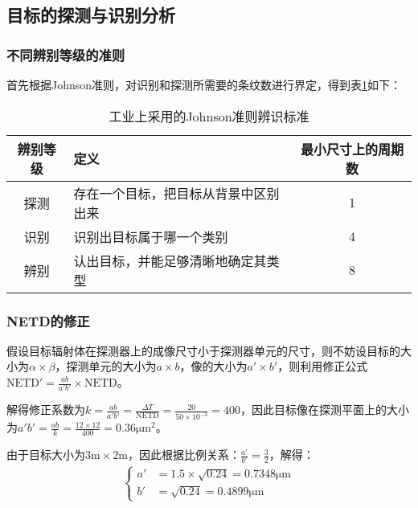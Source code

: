 \documentclass[11pt]{article}
\begin{document}
\subsection{目标的探测与识别分析}
\subsubsection{不同辨别等级的准则}
首先根据Johnson准则，对识别和探测所需要的条纹数进行界定，得到表\ref{table:Johnson准则}如下：
\begin{table}[H]
  \renewcommand{\arraystretch}{1.5}
  \centering
  \caption{工业上采用的Johnson准则辨识标准}
  \label{table:Johnson准则}
  \begin{tabularx}{\textwidth}{|c|>{\centering}X|c|}
    \hline
    辨别等级 & 定义                 & 最小尺寸上的周期数 \\\hline
    探测   & 存在一个目标，把目标从背景中区别出来 & 1         \\\hline
    识别   & 识别出目标属于哪一个类别       & 4         \\\hline
    辨别   & 认出目标，并能足够清晰地确定其类型  & 8         \\\hline
  \end{tabularx}
\end{table}
\subsubsection{NETD的修正}
假设目标辐射体在探测器上的成像尺寸小于探测器单元的尺寸，则不妨设目标的大小为$\alpha\times\beta$，探测单元的大小为$a\times b$，像的大小为$a'\times b'$，则利用修正公式$\displaystyle \mathrm{NETD}'=\frac{ab}{a'b'}\times\mathrm{NETD}$。\par
解得修正系数为$\displaystyle k=\frac{ab}{a'b'}=\frac{\Delta T}{\mathrm{NETD}}=\frac{20}{50\times10^{-3}}=400$，因此目标像在探测平面上的大小为$\displaystyle a'b'=\frac{ab}{k}=\frac{12\times12}{400}=0.36\unit{\um^2}$。\par
由于目标大小为$3\unit{\m}\times2\unit{\m}$，因此根据比例关系：$\displaystyle\frac{a'}{b'}=\frac{3}{2}$，解得：
\begin{align*}
  \left\{
  \begin{aligned}
    a' & =1.5\times\sqrt{0.24}=0.7348\unit{\um} \\
    b' & =\sqrt{0.24}=0.4899\unit{\um}
  \end{aligned}
  \right.
\end{align*}
\end{document}
